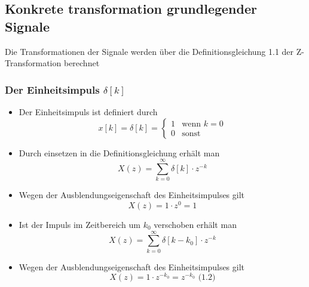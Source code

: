 \documentclass[11pt]{article}
\providecommand{\tightlist}{%
      \setlength{\itemsep}{0pt}\setlength{\parskip}{0pt}}
\begin{document}
    \subsection{Konkrete transformation grundlegender
Signale}\label{konkrete-transformation-grundlegender-signale}

Die Transformationen der Signale werden über die Definitionsgleichung
1.1 der Z-Transformation berechnet

    \subsubsection{\texorpdfstring{Der Einheitsimpuls
\(\delta[k]\)}{Der Einheitsimpuls \textbackslash{}delta{[}k{]}}}\label{der-einheitsimpuls-deltak}

\begin{itemize}
\tightlist
\item
  Der Einheitsimpuls ist definiert durch\\
  \[
  \displaystyle x[k] = \delta[k] = \begin{cases}
   1 & \text{wenn $k = 0$} \\ 
   0 & \text{sonst} 
   \end{cases}
  \]
\end{itemize}

    \begin{itemize}
\tightlist
\item
  Durch einsetzen in die Definitionsgleichung erhält man
  \[X(z) = \sum_{k=0}^\infty \delta[k] \cdot z^{-k}\]
\end{itemize}

    \begin{itemize}
\tightlist
\item
  Wegen der Ausblendungseigenschaft des Einheitsimpulses gilt
  \[X(z) = 1 \cdot z^0 = 1\]
\end{itemize}

    \begin{itemize}
\tightlist
\item
  Ist der Impuls im Zeitbereich um \(k_0\) verschoben erhält man
  \[X(z) = \sum_{k=0}^\infty \delta[k-k_0] \cdot z^{-k}\]
\end{itemize}

    \begin{itemize}
\tightlist
\item
  Wegen der Ausblendungseigenschaft des Einheitsimpulses gilt
  \[X(z) = 1 \cdot z^{-k_0} = z^{-k_0}\textrm{  (1.2)}\]
\end{itemize}
\end{document}
